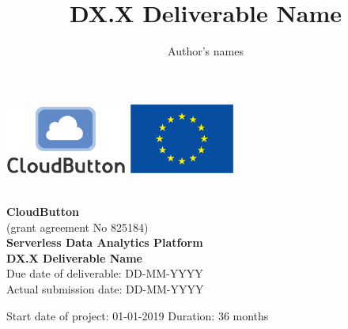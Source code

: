 \documentclass[a4paper,11pt]{article}
\title{DX.X Deliverable Name}
\author{Author's names}
\numberwithin{table}{subsection} %
\begin{document}
\clearpage\setcounter{page}{1}\pagestyle{empty}



\begin{center}
	\begin{center}
		\includegraphics[width=4cm]{figures/cloudbutton_logo.eps}
		\hfill
		\includegraphics[width=3.5cm]{figures/eu_flag_eps.eps}
	\end{center}
\vspace*{1.3cm}
 \\
\vspace*{0.6cm}
\noindent \Huge \textbf{CloudButton} \\
\vspace*{0.3cm}
\noindent \normalsize (grant agreement No 825184) \\
\vspace*{0.8cm}
\noindent \LARGE \textbf{Serverless Data Analytics Platform}\\
\vspace*{4.0cm}
\noindent \LARGE \textbf{DX.X Deliverable Name} \\
\vspace*{5.0cm}
\noindent \large Due date of deliverable: DD-MM-YYYY \\
\noindent \large Actual submission date: DD-MM-YYYY\\
\vspace*{3.0cm}

Start date of project: 01-01-2019
\hfill
Duration: 36 months\\

\end{center}




\newpage\pagestyle{empty}
\end{document}
